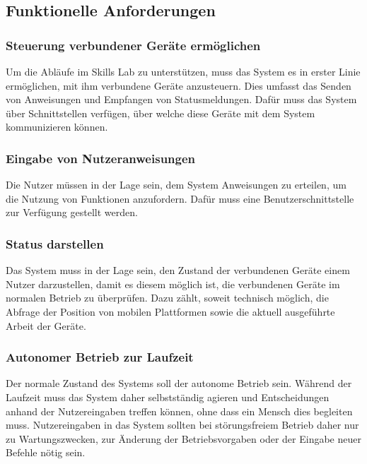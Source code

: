 \subsection{Funktionelle Anforderungen}

\subsubsection{Steuerung verbundener Geräte ermöglichen}

Um die Abläufe im Skills Lab zu unterstützen, muss das System es in erster Linie ermöglichen, mit ihm verbundene Geräte anzusteuern. Dies umfasst das Senden von Anweisungen und Empfangen von Statusmeldungen. Dafür muss das System über Schnittstellen verfügen, über welche diese Geräte mit dem System kommunizieren können.


\subsubsection{Eingabe von Nutzeranweisungen}

Die Nutzer müssen in der Lage sein, dem System Anweisungen zu erteilen, um die Nutzung von Funktionen anzufordern. Dafür muss eine Benutzerschnittstelle zur Verfügung gestellt werden.


\subsubsection{Status darstellen}

Das System muss in der Lage sein, den Zustand der verbundenen Geräte einem Nutzer darzustellen, damit es diesem möglich ist, die verbundenen Geräte im normalen Betrieb zu überprüfen. Dazu zählt, soweit technisch möglich, die Abfrage der Position von mobilen Plattformen sowie die aktuell ausgeführte Arbeit der Geräte.


\subsubsection{Autonomer Betrieb zur Laufzeit}

Der normale Zustand des Systems soll der autonome Betrieb sein. Während der Laufzeit muss das System daher selbstständig agieren und Entscheidungen anhand der Nutzereingaben treffen können, ohne dass ein Mensch dies begleiten muss. Nutzereingaben in das System sollten bei störungsfreiem Betrieb daher nur zu Wartungszwecken, zur Änderung der Betriebsvorgaben oder der Eingabe neuer Befehle nötig sein.


